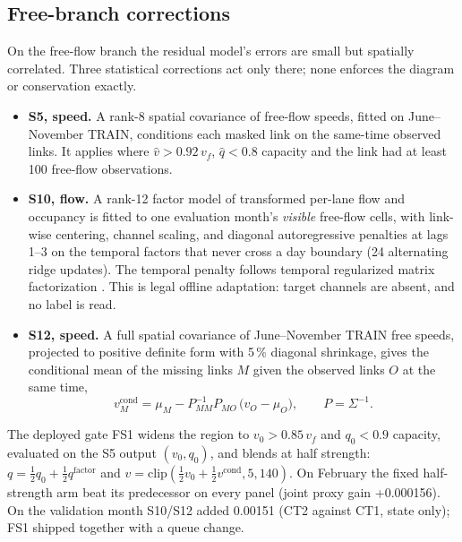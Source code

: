 \subsection{Free-branch corrections}\label{sec:freebranch}
On the free-flow branch the residual model's errors are small but spatially correlated. Three statistical
corrections act only there; none enforces the diagram or conservation exactly.
\begin{itemize}
  \item \textbf{S5, speed.} A rank-8 spatial covariance of free-flow speeds, fitted on June--November TRAIN, conditions
        each masked link on the same-time observed links. It applies where $\hat v>0.92\,v_f$, $\hat q<0.8$ capacity and
        the link had at least 100 free-flow observations.
  \item \textbf{S10, flow.} A rank-12 factor model of transformed per-lane flow and occupancy is fitted to one evaluation
        month's \emph{visible} free-flow cells, with link-wise centering, channel scaling, and diagonal autoregressive
        penalties at lags 1--3 on the temporal factors that never cross a day boundary (24 alternating ridge updates).
        The temporal penalty follows temporal regularized matrix factorization \cite{yu2016}. This is legal offline
        adaptation: target channels are absent, and no label is read.
  \item \textbf{S12, speed.} A full spatial covariance of June--November TRAIN free speeds, projected to positive
        definite form with 5\,\% diagonal shrinkage, gives the conditional mean of the missing links $M$ given the
        observed links $O$ at the same time,
        \begin{equation}
          v^{\mathrm{cond}}_M = \mu_M - P_{MM}^{-1}P_{MO}\,\big(v_O-\mu_O\big),\qquad P=\Sigma^{-1}.
          \label{eq:s12}
        \end{equation}
\end{itemize}
The deployed gate FS1 widens the region to $v_0>0.85\,v_f$ and $q_0<0.9$ capacity, evaluated on the S5 output
$(v_0,q_0)$, and blends at half strength: $q=\tfrac12 q_0+\tfrac12 q^{\mathrm{factor}}$ and
$v=\mathrm{clip}(\tfrac12 v_0+\tfrac12 v^{\mathrm{cond}},5,140)$. On February the fixed half-strength arm beat its
predecessor on every panel (joint proxy gain +0.000156). On the validation month S10/S12 added 0.00151 (CT2 against CT1,
state only); FS1 shipped together with a queue change.

